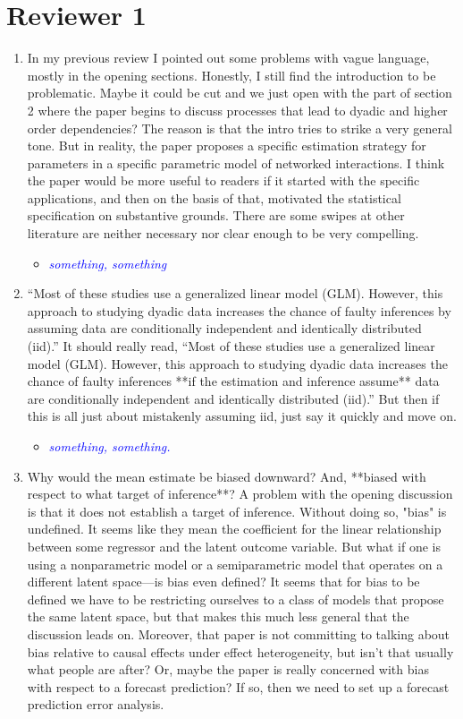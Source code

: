\section*{Reviewer 1}

\begin{enumerate}
	\item In my previous review I pointed out some problems with vague language, mostly in the opening sections.   Honestly, I still find the introduction to be problematic. Maybe it could be cut and we just open with the part of section 2 where the paper begins to discuss processes that lead to dyadic and higher order dependencies?  The reason is that the intro tries to strike a very general tone.  But in reality, the paper proposes a specific estimation strategy for parameters in a specific parametric model of networked interactions.  I think the paper would be more useful to readers if it started with the specific applications, and then on the basis of that, motivated the statistical specification on substantive grounds.  There are some swipes at other literature are neither necessary nor clear enough to be very compelling.
	\begin{itemize}
		\item \emph{ \textcolor{blue}{
		something, something
		}}
	\end{itemize}
	\item ``Most of these studies use a generalized linear model (GLM). However, this approach to studying dyadic data increases the chance of faulty inferences by assuming data are conditionally independent and identically distributed (iid).'' It should really read, ``Most of these studies use a generalized linear model (GLM). However, this approach to studying dyadic data increases the chance of faulty inferences **if the estimation and inference assume** data are conditionally independent and identically distributed (iid).''  But then if this is all just about mistakenly assuming iid, just say it quickly and move on.
	\begin{itemize}
		\item  \emph{ \textcolor{blue}{
		something, something.
		}}
	\end{itemize}
	\item Why would the mean estimate be biased downward?  And, **biased with respect to what target of inference**?  A problem with the opening discussion is that it does not establish a target of inference.  Without doing so, "bias" is undefined.  It seems like they mean the coefficient for the linear relationship between some regressor and the latent outcome variable. But what if one is using a nonparametric model or a semiparametric model that operates on a different latent space---is bias even defined?  It seems that for bias to be defined we have to be restricting ourselves to a class of models that propose the same latent space, but that makes this much less general that the discussion leads on.  Moreover, that paper is not committing to talking about bias relative to causal effects under effect heterogeneity, but isn't that usually what people are after?  Or, maybe the paper is really concerned with bias with respect to a forecast prediction? If so, then we need to set up a forecast prediction error analysis.

\end{enumerate}
